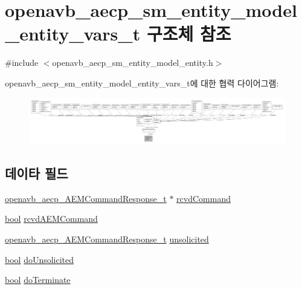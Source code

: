 \hypertarget{structopenavb__aecp__sm__entity__model__entity__vars__t}{}\section{openavb\+\_\+aecp\+\_\+sm\+\_\+entity\+\_\+model\+\_\+entity\+\_\+vars\+\_\+t 구조체 참조}
\label{structopenavb__aecp__sm__entity__model__entity__vars__t}


{\ttfamily \#include $<$openavb\+\_\+aecp\+\_\+sm\+\_\+entity\+\_\+model\+\_\+entity.\+h$>$}



openavb\+\_\+aecp\+\_\+sm\+\_\+entity\+\_\+model\+\_\+entity\+\_\+vars\+\_\+t에 대한 협력 다이어그램\+:
\nopagebreak
\begin{figure}[H]
\begin{center}
\leavevmode
\includegraphics[width=350pt]{structopenavb__aecp__sm__entity__model__entity__vars__t__coll__graph}
\end{center}
\end{figure}
\subsection*{데이타 필드}
\begin{DoxyCompactItemize}
\item 
\hyperlink{structopenavb__aecp___a_e_m_command_response__t}{openavb\+\_\+aecp\+\_\+\+A\+E\+M\+Command\+Response\+\_\+t} $\ast$ \hyperlink{structopenavb__aecp__sm__entity__model__entity__vars__t_aef1fe4239f8134d2fd5201da8912b220}{rcvd\+Command}
\item 
\hyperlink{avb__gptp_8h_af6a258d8f3ee5206d682d799316314b1}{bool} \hyperlink{structopenavb__aecp__sm__entity__model__entity__vars__t_a0ce6782631b2bb898089d31059d85cf3}{rcvd\+A\+E\+M\+Command}
\item 
\hyperlink{structopenavb__aecp___a_e_m_command_response__t}{openavb\+\_\+aecp\+\_\+\+A\+E\+M\+Command\+Response\+\_\+t} \hyperlink{structopenavb__aecp__sm__entity__model__entity__vars__t_a83c75774dc8eae330a023c87e3757127}{unsolicited}
\item 
\hyperlink{avb__gptp_8h_af6a258d8f3ee5206d682d799316314b1}{bool} \hyperlink{structopenavb__aecp__sm__entity__model__entity__vars__t_a39ce5dfd1b2b1fe36429c901a34b5bde}{do\+Unsolicited}
\item 
\hyperlink{avb__gptp_8h_af6a258d8f3ee5206d682d799316314b1}{bool} \hyperlink{structopenavb__aecp__sm__entity__model__entity__vars__t_a5fc548cdb095393450f28eab966a626f}{do\+Terminate}
\end{DoxyCompactItemize}


